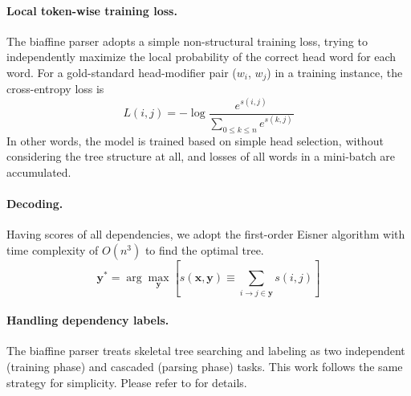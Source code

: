 \paragraph{Local token-wise training loss.}
The biaffine parser adopts a simple non-structural training loss,
trying to independently maximize the local probability of the correct head word for each word.
For a gold-standard head-modifier pair ($w_i$, $w_j$)
in a training instance,
the cross-entropy loss is
\begin{equation} \label{equation:biaffine-loss}
    \mathit{L}(i,j) = -\log{\frac{e^{s(i,j)}}{\sum_{0 \le k \le n} e^{s(k,j)}}}
\end{equation}
In other words, the model is trained based on simple head selection,
without considering the tree structure at all, and
losses of all words in a mini-batch are accumulated.

\paragraph{Decoding.} Having scores of all dependencies,
we adopt the first-order Eisner algorithm with time complexity of $O(n^3)$
to find the optimal tree.
\begin{equation}
    \label{equation:map-decoding}
    {\boldsymbol{y}}^* = \arg\max_{\boldsymbol{y}} \left[ s(\boldsymbol{x},\boldsymbol{y}) \equiv
        \sum_{i \rightarrow j \in \boldsymbol{y}}{s(i,j)} \right]
\end{equation}

\paragraph{Handling dependency labels.}
The biaffine parser treats skeletal tree searching and labeling as two independent (training phase) and cascaded (parsing phase) tasks.
This work follows the same strategy for simplicity. Please refer to \citet{Timothy-d17-biaffine} for details.

